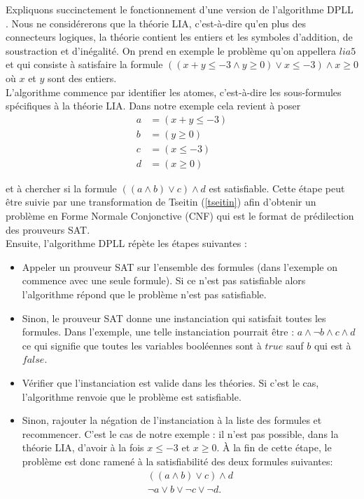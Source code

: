 \documentclass[11pt]{article}
\begin{document}
Expliquons succinctement le fonctionnement d'une version de l'algorithme DPLL \cite{dpll}. Nous ne considérerons que la théorie LIA, c'est-à-dire qu'en plus des connecteurs logiques, la théorie contient les entiers et les symboles d'addition, de soustraction et d'inégalité. On prend en exemple le problème qu'on appellera $lia5$ et qui consiste à satisfaire la formule $((x + y \leq -3 \wedge y \geq 0) \vee x \leq -3) \wedge x \geq 0$ où $x$ et $y$ sont des entiers. \\

L'algorithme commence par identifier les atomes, c'est-à-dire les sous-formules spécifiques à la théorie LIA. Dans notre exemple cela revient à poser 
\begin{align*}
a &= (x + y \leq -3) \\
b &= (y \geq 0) \\
c &= (x \leq -3) \\
d &= (x \geq 0)
\end{align*}

et à chercher si la formule  $((a \wedge b) \vee c) \wedge d$ est satisfiable. Cette étape peut être suivie par une transformation de Tseitin (\ref{tseitin}) afin d'obtenir un problème en Forme Normale Conjonctive (CNF) qui est le format de prédilection des prouveurs SAT. \\

Ensuite, l'algorithme DPLL répète les étapes suivantes :
\begin{itemize}
\item Appeler un prouveur SAT sur l'ensemble des formules (dans l'exemple on commence avec une seule formule). Si ce n'est pas satisfiable alors l'algorithme répond que le problème n'est pas satisfiable.
\item Sinon, le prouveur SAT donne une instanciation qui satisfait toutes les formules. Dans l'exemple, une telle instanciation pourrait être :
  $a \wedge \neg b \wedge c \wedge d$
ce qui signifie que toutes les variables booléennes sont à $true$ sauf $b$ qui est à $false$.
\item Vérifier que l'instanciation est valide dans les théories. Si c'est le cas, l'algorithme renvoie que le problème est satisfiable.
\item Sinon, rajouter la négation de l'instanciation à la liste des formules et recommencer. C'est le cas de notre exemple : il n'est pas possible, dans la théorie LIA, d'avoir à la fois $x \leq -3$ et $x \geq 0$. À la fin de cette étape, le problème est donc ramené à la satisfiabilité des deux formules suivantes:
  \begin{align*}
    ((a \wedge b) \vee c) \wedge d \\
    \neg a \vee b \vee \neg c \vee \neg d.
  \end{align*}
\end{itemize}
\end{document}
